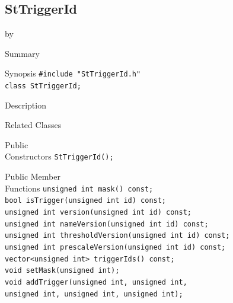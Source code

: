 \documentclass[twoside]{article}
\newcommand{\entrylabel}[1]{\mbox{\textbf{{#1}}}\hfil}%
\newenvironment{entry}
{\begin{list}{}%
    {\renewcommand{\makelabel}{\entrylabel}%
     \setlength{\labelwidth}{90pt}%
     \setlength{\leftmargin}{\labelwidth}
     \advance\leftmargin by \labelsep%
      }%
    }%
  {\end{list}}
\newcommand{\Entrylabel}[1]%
{\raisebox{0pt}[1ex][0pt]{\makebox[\labelwidth][l]%
    {\parbox[t]{\labelwidth}{\hspace{0pt}\textbf{{#1}}}}}}
\newenvironment{Entry}%
{\renewcommand{\entrylabel}{\Entrylabel}\begin{entry}}%
  {\end{entry}}
\begin{document}
\subsection{StTriggerId}
\label{sec:StTriggerId}
\begin{Entry}
\item[Summary] 
\item[Synopsis]
    \verb+#include "StTriggerId.h"+\\
    \verb+class StTriggerId;+\\
\item[Description]
\item[Related Classes]
\item[Public\\ Constructors]
    \verb+StTriggerId();+\\
\item[Public Member\\ Functions]
    \verb+unsigned int mask() const;+\\
    \verb+bool isTrigger(unsigned int id) const;+\\
    \verb+unsigned int version(unsigned int id) const;+\\
    \verb+unsigned int nameVersion(unsigned int id) const;+\\
    \verb+unsigned int thresholdVersion(unsigned int id) const;+\\
    \verb+unsigned int prescaleVersion(unsigned int id) const; +\\
    \verb+vector<unsigned int> triggerIds() const; +\\
    \verb+void setMask(unsigned int);+\\
    \verb+void addTrigger(unsigned int, unsigned int,+\\
    \verb+unsigned int, unsigned int, unsigned int);+\\
\end{Entry}
\clearpage
\end{document}
